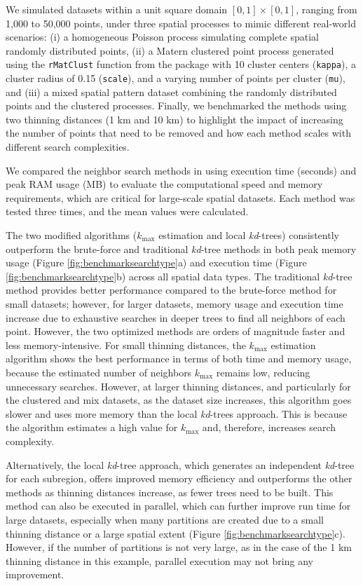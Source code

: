 We simulated datasets within a unit square domain \([0,1] \times [0,1]\), ranging from 1,000 to 50,000 points, under three spatial processes to mimic different real-world scenarios: (i) a homogeneous Poisson process simulating complete spatial randomly distributed points, (ii) a Matern clustered point process generated using the \texttt{rMatClust} function from the  package \citep{spatstatRpackage} with 10 cluster centers (\texttt{kappa}), a cluster radius of 0.15 (\texttt{scale}), and a varying number of points per cluster (\texttt{mu}), and (iii) a mixed spatial pattern dataset combining the randomly distributed points and the clustered processes. Finally, we benchmarked the methods using two thinning distances (1 km and 10 km) to highlight the impact of increasing the number of points that need to be removed and how each method scales with different search complexities.

We compared the neighbor search methods in  using execution time (seconds) and peak RAM usage (MB) to evaluate the computational speed and memory requirements, which are critical for large-scale spatial datasets. Each method was tested three times, and the mean values were calculated.

The two modified algorithms (\(k_\text{max}\) estimation and local \emph{kd}-trees) consistently outperform the brute-force and traditional \emph{kd}-tree methods in both peak memory usage (Figure \ref{fig:benchmarksearchtype}a) and execution time (Figure \ref{fig:benchmarksearchtype}b) across all spatial data types. The traditional \emph{kd}-tree method provides better performance compared to the brute-force method for small datasets; however, for larger datasets, memory usage and execution time increase due to exhaustive searches in deeper trees to find all neighbors of each point. However, the two optimized methods are orders of magnitude faster and less memory-intensive. For small thinning distances, the \(k_\text{max}\) estimation algorithm shows the best performance in terms of both time and memory usage, because the estimated number of neighbors \(k_\text{max}\) remains low, reducing unnecessary searches. However, at larger thinning distances, and particularly for the clustered and mix datasets, as the dataset size increases, this algorithm goes slower and uses more memory than the local \emph{kd}-trees approach. This is because the algorithm estimates a high value for \(k_\text{max}\) and, therefore, increases search complexity.

Alternatively, the local \emph{kd}-tree approach, which generates an independent \emph{kd}-tree for each subregion, offers improved memory efficiency and outperforms the other methods as thinning distances increase, as fewer trees need to be built. This method can also be executed in parallel, which can further improve run time for large datasets, especially when many partitions are created due to a small thinning distance or a large spatial extent (Figure \ref{fig:benchmarksearchtype}c). However, if the number of partitions is not very large, as in the case of the 1 km thinning distance in this example, parallel execution may not bring any improvement.

